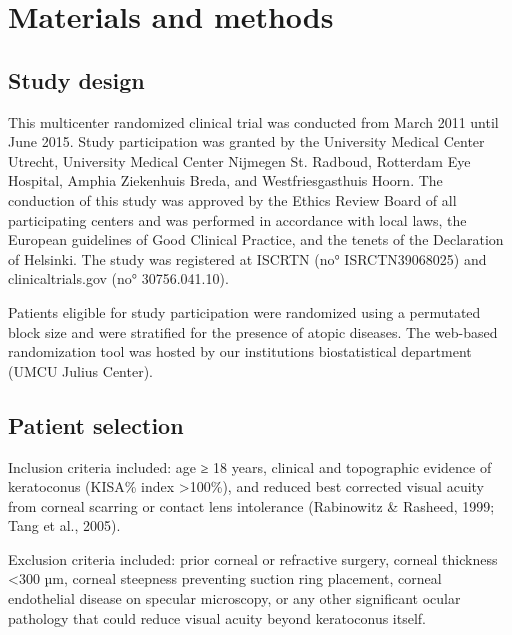 \documentclass[authordate, empirical]{jote-new-article}
\begin{document}
	\section{Materials and methods}



	\subsection{Study design}



	This multicenter randomized clinical trial was conducted from March 2011 until June 2015. Study participation was granted by the University Medical Center Utrecht, University Medical Center Nijmegen St. Radboud, Rotterdam Eye Hospital, Amphia Ziekenhuis Breda, and Westfriesgasthuis Hoorn. The conduction of this study was approved by the Ethics Review Board of all participating centers and was performed in accordance with local laws, the European guidelines of Good Clinical Practice, and the tenets of the Declaration of Helsinki. The study was registered at ISCRTN (no° ISRCTN39068025) and clinicaltrials.gov (no° 30756.041.10).



	Patients eligible for study participation were randomized using a permutated block size and were stratified for the presence of atopic diseases. The web-based randomization tool was hosted by our institutions biostatistical department (UMCU Julius Center).



	\subsection{Patient selection}



	Inclusion criteria included: age ≥ 18 years, clinical and topographic evidence of keratoconus (KISA\% index >100\%), and reduced best corrected visual acuity from corneal scarring or contact lens intolerance (Rabinowitz \& Rasheed, 1999; Tang et al., 2005).



	Exclusion criteria included: prior corneal or refractive surgery, corneal thickness <300 µm, corneal steepness preventing suction ring placement, corneal endothelial disease on specular microscopy, or any other significant ocular pathology that could reduce visual acuity beyond keratoconus itself.
\end{document}
